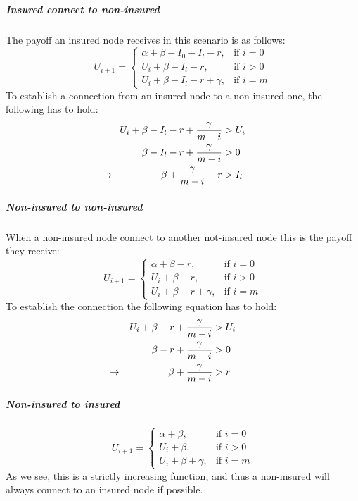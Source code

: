 \subparagraph{Insured connect to non-insured}
The payoff an insured node receives in this scenario is as follows:
\begin{equation}
    U_{i+1}= 
\begin{cases}
    \alpha + \beta - I_{0} - I_{l} -r,& \text{if } i = 0\\
    U_{i}+\beta -I_{l}-r,& \text{if }  i>0\\
    U_{i}+\beta -I_{l}-r+\gamma,& \text{if } i=m
\end{cases}
\label{eq:itonoti}
\end{equation}
To establish a connection from an insured node to a non-insured one, the following has to hold:
\begin{eqnarray}
U_{i}+\beta-I_{l}-r+\frac{\gamma}{m-i}&>U_{i} \nonumber \\ 
\beta-I_{l}-r+\frac{\gamma}{m-i}&>0 \nonumber \\ 
\llap{$\rightarrow$\hspace{50pt}} \beta+\frac{\gamma}{m-i}-r&>I_{l} 
\end{eqnarray}
\subparagraph{Non-insured to non-insured}
When a non-insured node connect to another not-insured node this is the payoff they receive:
\begin{equation}
    U_{i+1}= 
\begin{cases}
    \alpha + \beta -r,& \text{if } i = 0\\
    U_{i}+\beta -r,& \text{if }  i>0\\
    U_{i}+\beta -r +\gamma,& \text{if } i=m
\end{cases}
\label{eq:noitonoti}
\end{equation}
To establish the connection the following equation has to hold:
\begin{eqnarray}
U_{i}+\beta-r+\frac{\gamma}{m-i}&>U_{i} \nonumber \\ 
\beta-r+\frac{\gamma}{m-i}&>0 \nonumber \\ 
\llap{$\rightarrow$\hspace{50pt}} \beta+\frac{\gamma}{m-i}&>r
\end{eqnarray}
\subparagraph{Non-insured to insured}
\begin{equation}
    U_{i+1}= 
\begin{cases}
    \alpha + \beta,& \text{if } i = 0\\
    U_{i}+\beta,& \text{if }  i>0\\
    U_{i}+\beta +\gamma,& \text{if } i=m
\end{cases}
\label{eq:noitoti}
\end{equation}
As we see, this is a strictly increasing function, and thus a non-insured will always connect to an insured node if possible.
